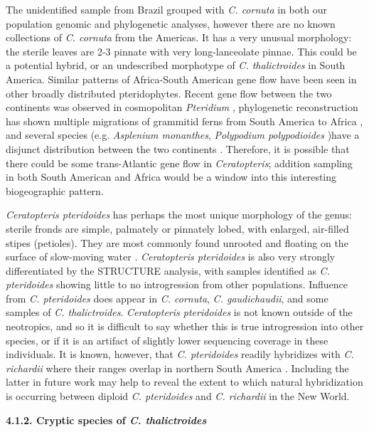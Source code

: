 \documentclass[12pt]{article}
\begin{document}
\begin{flushleft}
The unidentified sample from Brazil grouped with \textit{C. cornuta} in both our population genomic and phylogenetic analyses, however there are no known collections of \textit{C. cornuta} from the Americas. It has a very unusual morphology: the sterile leaves are 2-3 pinnate with very long-lanceolate pinnae. This could be a potential hybrid, or an undescribed morphotype of \textit{C. thalictroides} in South America. Similar patterns of Africa-South American gene flow have been seen in other broadly distributed pteridophytes. Recent gene flow between the two continents was observed in cosmopolitan \textit{Pteridium} \autocite{Wolf2019}, phylogenetic reconstruction has shown multiple migrations of grammitid ferns from South America to Africa \autocite{Sundue2014}, and several species (e.g. \textit{Asplenium monanthes}, \textit{Polypodium polypodioides} )have a disjunct distribution between the two continents \cite{kornas1993}. Therefore, it is possible that there could be some trans-Atlantic gene flow in \textit{Ceratopteris}; addition sampling in both South American and Africa would be a window into this interesting biogeographic pattern. 

\textit{Ceratopteris pteridoides} has perhaps the most unique morphology of the genus: sterile fronds are simple, palmately or pinnately lobed, with enlarged, air-filled stipes (petioles). They are most commonly found unrooted and floating on the surface of slow-moving water \autocite{LloydTax1974}. \textit{Ceratopteris pteridoides} is also very strongly differentiated by the {\small{STRUCTURE}} analysis, with samples identified as \textit{C. pteridoides} showing little to no introgression from other populations. Influence from \textit{C. pteridoides} does appear in \textit{C. cornuta}, \textit{C. gaudichaudii}, and some samples of \textit{C. thalictroides}. \textit{Ceratopteris pteridoides} is not known outside of the neotropics, and so it is difficult to say whether this is true introgression into other species, or if it is an artifact of slightly lower sequencing coverage in these individuals. It is known, however, that \textit{C. pteridoides} readily hybridizes with \textit{C. richardii} where their ranges overlap in northern South America \autocite{hickok1974}. Including the latter in future work may help to reveal the extent to which natural hybridization is occurring between diploid \textit{C. pteridoides} and \textit{C. richardii} in the New World. 

\textbf{4.1.2. Cryptic species of \textit{C. thalictroides}}


\end{flushleft}
\end{document}
